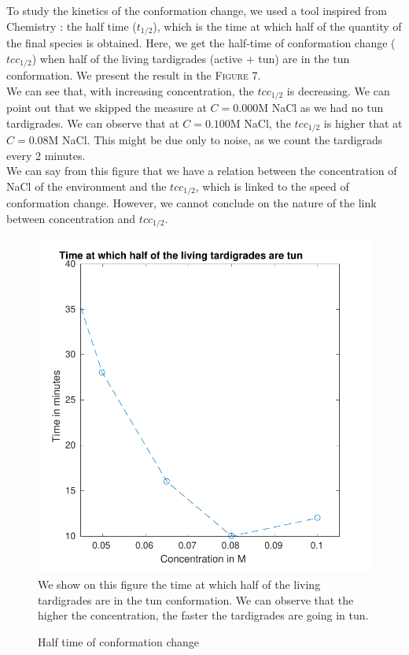 \documentclass[12pt,a4paper, twocolumn]{article}
\begin{document}
To study the kinetics of the conformation change, we used a tool inspired from Chemistry : the half time ($t_{1/2}$), which is the time at which half of the quantity of the final species is obtained. Here, we get the half-time of conformation change ($tcc_{1/2}$) when half of the living tardigrades (active + tun) are in the tun conformation. We present the result in the \textsc{Figure} 7.\\
We can see that, with increasing concentration, the $tcc_{1/2}$ is decreasing. We can point out that we skipped the measure at $C=0.000$M NaCl as we had no tun tardigrades. We can observe that at $C=0.100$M NaCl, the $tcc_{1/2}$ is higher that at $C=0.08$M NaCl. This might be due only to noise, as we count the tardigrads every 2 minutes.\\
We can say from this figure that we have a relation between the concentration of NaCl of the environment and the $tcc_{1/2}$, which is linked to the speed of conformation change. However, we cannot conclude on the nature of the link between concentration and $tcc_{1/2}$.\\

\begin{figure}
\includegraphics[width=\linewidth]{tcc.pdf}
\label{tcc}
We show on this figure the time at which half of the living tardigrades are in the tun conformation. We can observe that the higher the concentration, the faster the tardigrades are going in tun.
\caption{Half time of conformation change}
\end{figure}
\end{document}

